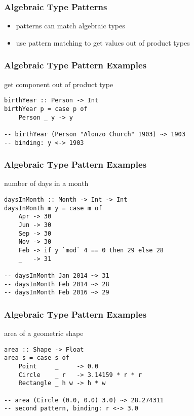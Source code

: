 \documentclass[dvipsnames]{beamer}
\theoremstyle{plain}
\begin{document}
\begin{frame}
  \frametitle{Algebraic Type Patterns}

  \begin{itemize}
    \item patterns can match algebraic types
    \item use pattern matching to get values out of product types
  \end{itemize}
\end{frame}

\begin{frame}[fragile]
  \frametitle{Algebraic Type Pattern Examples}

  \begin{exampleblock}{get component out of product type}
    \begin{lstlisting}
birthYear :: Person -> Int
birthYear p = case p of
    Person _ y -> y

-- birthYear (Person "Alonzo Church" 1903) ~> 1903
-- binding: y <-> 1903
    \end{lstlisting}
  \end{exampleblock}
\end{frame}

\begin{frame}[fragile]
  \frametitle{Algebraic Type Pattern Examples}

  \begin{exampleblock}{number of days in a month}
    \begin{lstlisting}
daysInMonth :: Month -> Int -> Int
daysInMonth m y = case m of
    Apr -> 30
    Jun -> 30
    Sep -> 30
    Nov -> 30
    Feb -> if y `mod` 4 == 0 then 29 else 28
    _   -> 31

-- daysInMonth Jan 2014 ~> 31
-- daysInMonth Feb 2014 ~> 28
-- daysInMonth Feb 2016 ~> 29
    \end{lstlisting}
  \end{exampleblock}
\end{frame}

\begin{frame}[fragile]
  \frametitle{Algebraic Type Pattern Examples}

  \begin{exampleblock}{area of a geometric shape}
    \begin{lstlisting}
area :: Shape -> Float
area s = case s of
    Point     _     -> 0.0
    Circle    _ r   -> 3.14159 * r * r
    Rectangle _ h w -> h * w

-- area (Circle (0.0, 0.0) 3.0) ~> 28.274311
-- second pattern, binding: r <-> 3.0
    \end{lstlisting}
  \end{exampleblock}
\end{frame}
\end{document}
